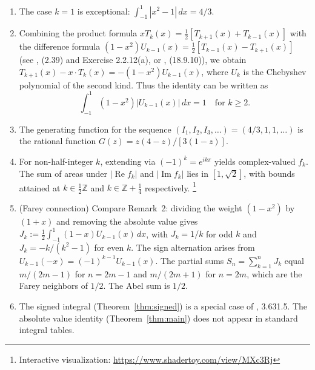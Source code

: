 \documentclass[11pt]{article}
\begin{document}
\begin{enumerate}
\item The case $k=1$ is exceptional: $\int_{-1}^{1}|x^2 - 1|\,dx = 4/3$.

\item Combining the product formula $xT_k(x) = \frac{1}{2}[T_{k+1}(x) + T_{k-1}(x)]$
with the difference formula $(1-x^2)U_{k-1}(x) = \frac{1}{2}[T_{k-1}(x) - T_{k+1}(x)]$
(see \cite{mason}, (2.39) and Exercise 2.2.12(a), or \cite{dlmf}, (18.9.10)),
we obtain $T_{k+1}(x) - x \cdot T_k(x) = -(1-x^2) U_{k-1}(x)$, where $U_k$ is the
Chebyshev polynomial of the second kind. Thus the identity can be written as
\[
\int_{-1}^{1} (1-x^2)|U_{k-1}(x)| \, dx = 1 \quad \text{for } k \geq 2.
\]

\item The generating function for the sequence $(I_1, I_2, I_3, \ldots) = (4/3, 1, 1, \ldots)$
is the rational function $G(z) = z(4-z)/[3(1-z)]$.

\item For non-half-integer $k$, extending via $(-1)^k = e^{ik\pi}$ yields
complex-valued $f_k$. The sum of areas under $|\operatorname{Re} f_k|$ and
$|\operatorname{Im} f_k|$ lies in $[1, \sqrt{2}]$, with bounds attained at
$k \in \tfrac{1}{2}\mathbb{Z}$ and $k \in \mathbb{Z} + \tfrac{1}{4}$ respectively.%
\footnote{Interactive visualization: \url{https://www.shadertoy.com/view/MXc3Rj}}

\item (Farey connection) Compare Remark~2: dividing the weight $(1-x^2)$ by $(1+x)$
and removing the absolute value gives
$J_k := \frac{1}{2}\int_{-1}^{1} (1-x) U_{k-1}(x) \, dx$, with $J_k = 1/k$ for
odd $k$ and $J_k = -k/(k^2-1)$ for even $k$. The sign alternation arises from
$U_{k-1}(-x) = (-1)^{k-1}U_{k-1}(x)$. The partial sums $S_n = \sum_{k=1}^n J_k$
equal $m/(2m-1)$ for $n = 2m-1$ and $m/(2m+1)$ for $n = 2m$, which are the Farey
neighbors of $1/2$. The Abel sum is $1/2$.

\item The signed integral (Theorem~\ref{thm:signed}) is a special case of
\cite{gr}, 3.631.5. The absolute value identity (Theorem~\ref{thm:main}) does
not appear in standard integral tables.
\end{enumerate}



\end{document}
